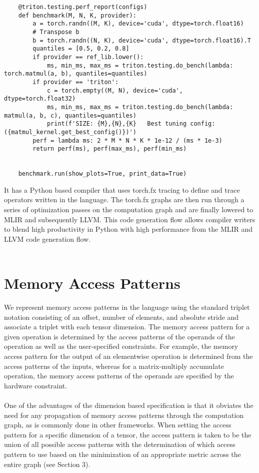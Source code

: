 \documentclass{article}
\begin{document}
\begin{lstlisting}
    @triton.testing.perf_report(configs)
    def benchmark(M, N, K, provider):
        a = torch.randn((M, K), device='cuda', dtype=torch.float16)
        # Transpose b
        b = torch.randn((N, K), device='cuda', dtype=torch.float16).T
        quantiles = [0.5, 0.2, 0.8]
        if provider == ref_lib.lower():
            ms, min_ms, max_ms = triton.testing.do_bench(lambda: torch.matmul(a, b), quantiles=quantiles)
        if provider == 'triton':
            c = torch.empty((M, N), device='cuda', dtype=torch.float32)
            ms, min_ms, max_ms = triton.testing.do_bench(lambda: matmul(a, b, c), quantiles=quantiles)
            print(f'SIZE: {M},{N},{K}   Best tuning config: ({matmul_kernel.get_best_config()})')
        perf = lambda ms: 2 * M * N * K * 1e-12 / (ms * 1e-3)
        return perf(ms), perf(max_ms), perf(min_ms)


    benchmark.run(show_plots=True, print_data=True)
\end{lstlisting}


\iffalse
It has a Python based compiler that uses torch.fx tracing to define
and trace operators written in the language. The torch.fx graphs are then run through a series of optimization passes
on the computation graph and are finally lowered to MLIR and subsequently LLVM. This code generation flow allows compiler writers
to blend high productivity in Python with high performance from the MLIR and LLVM
code generation flow.
\\ \\


\section{Memory Access Patterns}
We represent memory access patterns in the language using the standard
triplet notation consisting of an offset, number of elements, and absolute stride and associate
a triplet with each tensor dimension. The memory access pattern for a given operation
is determined by the access patterns of the operands of the operation as well as
the user-specified constraints. For example, the memory access pattern for the output
of an elementwise operation is determined from the access patterns of the inputs,
whereas for a matrix-multiply accumulate operation, the memory access patterns of the operands are specified by
the hardware constraint.
\\ \\
One of the advantages of the dimension based specification is that it obviates
the need for any propagation of memory access patterns through the computation graph,
as is commonly done in other frameworks. When setting the access pattern for a specific
dimension of a tensor, the access pattern is taken to be the union of all possible
access patterns with the determination of which access pattern to use based on
the minimization of an appropriate metric across the entire graph (see Section 3).
\end{document}

